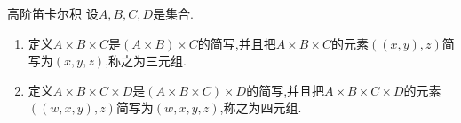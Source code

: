 \begin{definition}{高阶笛卡尔积}{}
	设$A,B,C,D$是集合.
	\begin{enumerate}
		\item 定义$A\times B\times C$是$\left(A\times B\right)\times C$的简写,并且把$A\times B\times C$的元素$\left(\left(x,y\right),z\right)$简写为$\left(x,y,z\right)$,称之为三元组.
		\item 定义$A\times B\times C\times D$是$\left(A\times B\times C\right)\times D$的简写,并且把$A\times B\times C\times D$的元素$\left(\left(w,x,y\right),z\right)$简写为$\left(w,x,y,z\right)$,称之为四元组.
	\end{enumerate}
\end{definition}




